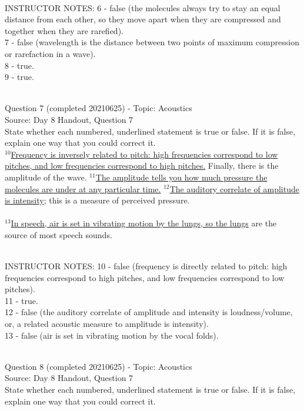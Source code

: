 \documentclass[12pt]{article}
\begin{document}
~\\
INSTRUCTOR NOTES: 6 - false (the molecules always try to stay an equal distance from each other, so they move apart when they are compressed and together when they are rarefied).\\7 - false (wavelength is the distance between two points of maximum compression or rarefaction in a wave).\\8 - true.\\9 - true.


~\\

{\large Question 7} (completed 20210625) - Topic: Acoustics\\
Source: Day 8 Handout, Question 7\\

State whether each numbered, underlined statement is true or false. If it is false, explain one way that you could correct it.\\

$^{10}$\ul{Frequency is inversely related to pitch: high frequencies correspond to low pitches, and low frequencies correspond to high pitches.} Finally, there is the amplitude of the wave. $^{11}$\ul{The amplitude tells you how much pressure the molecules are under at any particular time.} $^{12}$\ul{The auditory correlate of amplitude is intensity}; this is a measure of perceived pressure.\\\\$^{13}$\ul{In speech, air is set in vibrating motion by the lungs, so the lungs} are the source of most speech sounds.


~\\
INSTRUCTOR NOTES: 10 - false (frequency is directly related to pitch: high frequencies correspond to high pitches, and low frequencies correspond to low pitches).\\11 - true.\\12 - false (the auditory correlate of amplitude and intensity is loudness/volume, or, a related acoustic measure to amplitude is intensity).\\13 - false (air is set in vibrating motion by the vocal folds).


~\\

{\large Question 8} (completed 20210625) - Topic: Acoustics\\
Source: Day 8 Handout, Question 7\\

State whether each numbered, underlined statement is true or false. If it is false, explain one way that you could correct it.\\
\end{document}
